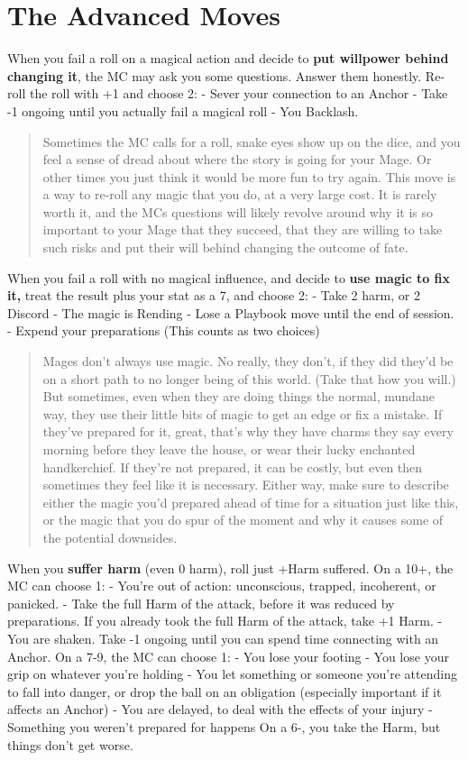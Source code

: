 \documentclass[10pt,twoside,openright]{memoir}
\begin{document}
\hypertarget{the-advanced-moves}{%
\section{The Advanced Moves}\label{the-advanced-moves}}

When you fail a roll on a magical action and decide to \textbf{put
willpower behind changing it}, the MC may ask you some questions. Answer
them honestly. Re-roll the roll with +1 and choose 2: - Sever your
connection to an Anchor - Take -1 ongoing until you actually fail a
magical roll - You Backlash.

\begin{quote}
Sometimes the MC calls for a roll, snake eyes show up on the dice, and
you feel a sense of dread about where the story is going for your Mage.
Or other times you just think it would be more fun to try again. This
move is a way to re-roll any magic that you do, at a very large cost. It
is rarely worth it, and the MCs questions will likely revolve around why
it is so important to your Mage that they succeed, that they are willing
to take such risks and put their will behind changing the outcome of
fate.
\end{quote}

When you fail a roll with no magical influence, and decide to
\textbf{use magic to fix it,} treat the result plus your stat as a 7,
and choose 2: - Take 2 harm, or 2 Discord - The magic is Rending - Lose
a Playbook move until the end of session. - Expend your preparations
(This counts as two choices)

\begin{quote}
Mages don't always use magic. No really, they don't, if they did they'd
be on a short path to no longer being of this world. (Take that how you
will.) But sometimes, even when they are doing things the normal,
mundane way, they use their little bits of magic to get an edge or fix a
mistake. If they've prepared for it, great, that's why they have charms
they say every morning before they leave the house, or wear their lucky
enchanted handkerchief. If they're not prepared, it can be costly, but
even then sometimes they feel like it is necessary. Either way, make
sure to describe either the magic you'd prepared ahead of time for a
situation just like this, or the magic that you do spur of the moment
and why it causes some of the potential downsides.
\end{quote}

When you \textbf{suffer harm} (even 0 harm), roll just +Harm suffered.
On a 10+, the MC can choose 1: - You're out of action: unconscious,
trapped, incoherent, or panicked. - Take the full Harm of the attack,
before it was reduced by preparations. If you already took the full Harm
of the attack, take +1 Harm. - You are shaken. Take -1 ongoing until you
can spend time connecting with an Anchor. On a 7-9, the MC can choose 1:
- You lose your footing - You lose your grip on whatever you're holding
- You let something or someone you're attending to fall into danger, or
drop the ball on an obligation (especially important if it affects an
Anchor) - You are delayed, to deal with the effects of your injury -
Something you weren't prepared for happens On a 6-, you take the Harm,
but things don't get worse.
\end{document}
